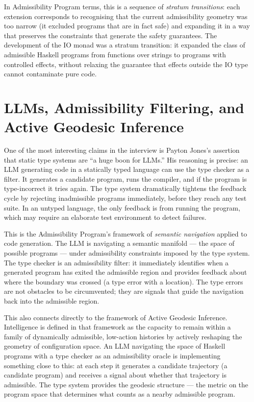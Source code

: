 \documentclass[12pt]{article}
\begin{document}
In Admissibility Program terms, this is a sequence of \emph{stratum
transitions}: each extension corresponds to recognising that the current
admissibility geometry was too narrow (it excluded programs that are in fact
safe) and expanding it in a way that preserves the constraints that generate the
safety guarantees. The development of the IO monad was a stratum transition: it
expanded the class of admissible Haskell programs from functions over strings to
programs with controlled effects, without relaxing the guarantee that effects
outside the IO type cannot contaminate pure code.

\section{LLMs, Admissibility Filtering, and Active Geodesic Inference}

One of the most interesting claims in the interview is Payton Jones's assertion
that static type systems are ``a huge boon for LLMs.'' His reasoning is
precise: an LLM generating code in a statically typed language can use the type
checker as a filter. It generates a candidate program, runs the compiler, and if
the program is type-incorrect it tries again. The type system dramatically
tightens the feedback cycle by rejecting inadmissible programs immediately,
before they reach any test suite. In an untyped language, the only feedback is
from running the program, which may require an elaborate test environment to
detect failures.

This is the Admissibility Program's framework of \emph{semantic navigation}
applied to code generation. The LLM is navigating a semantic manifold — the
space of possible programs — under admissibility constraints imposed by the type
system. The type checker is an admissibility filter: it immediately identifies
when a generated program has exited the admissible region and provides feedback
about where the boundary was crossed (a type error with a location). The type
errors are not obstacles to be circumvented; they are signals that guide the
navigation back into the admissible region.

This also connects directly to the framework of Active Geodesic Inference.
Intelligence is defined in that framework as the capacity to remain within a
family of dynamically admissible, low-action histories by actively reshaping the
geometry of configuration space. An LLM navigating the space of Haskell programs
with a type checker as an admissibility oracle is implementing something close to
this: at each step it generates a candidate trajectory (a candidate program) and
receives a signal about whether that trajectory is admissible. The type system
provides the geodesic structure — the metric on the program space that determines
what counts as a nearby admissible program.
\end{document}
